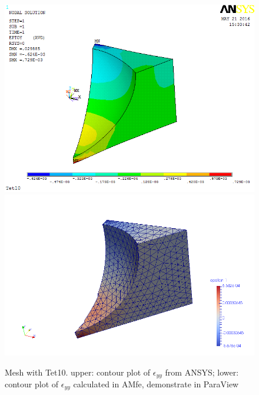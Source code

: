 \begin{figure}[htbp]
	\begin{center}
		\includegraphics[width=13cm,clip]{Tet10_Eyy.png} 		
		\includegraphics[width=13cm,clip]{Tet10_Eyy_P.png} 		
		\caption{Mesh with Tet10. upper: contour plot of $\epsilon_{yy}$ from ANSYS; lower: contour plot of $\epsilon_{yy}$ calculated in AMfe, demonstrate in ParaView} \label{fig: Tet10_Eyy}
	\end{center}
\end{figure}

